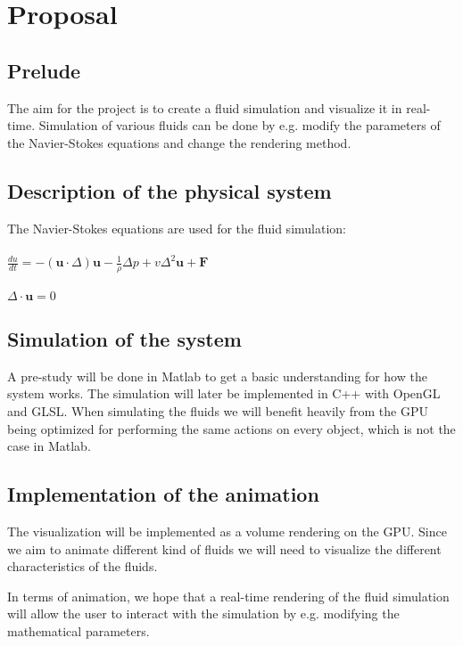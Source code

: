 \documentclass[a4paper,12pt,twoside,swedish]{report}
\begin{document}
\pagestyle{plain}

\setcounter{page}{1}

\chapter{Proposal}

\section{Prelude}
The aim for the project is to create a fluid simulation and visualize it in real-time. Simulation of various fluids can be done by e.g. modify the parameters of the Navier-Stokes equations and change the rendering method.

\section{Description of the physical system}
The Navier-Stokes equations are used for the fluid simulation:\\\\
\(\frac{du}{dt} = - (\textbf{u}\cdot{\Delta})\textbf{u} - \frac{1}{\rho}\Delta p + v \Delta^2 \textbf{u} + \textbf{F}\)\\\\
\(\Delta \cdot \textbf{u} = 0 \)

\section{Simulation of the system}
A pre-study will be done in Matlab to get a basic understanding for how the system works. The simulation will later be implemented in C++ with OpenGL and GLSL. When simulating the fluids we will benefit heavily from the GPU being optimized for performing the same actions on every object, which is not the case in Matlab.

\section{Implementation of the animation}
The visualization will be implemented as a volume rendering on the GPU. Since we aim to animate different kind of fluids we will need to visualize the different characteristics of the fluids.

In terms of animation, we hope that a real-time rendering of the fluid simulation will allow the user to interact with the simulation by e.g. modifying the mathematical parameters.
\end{document}
